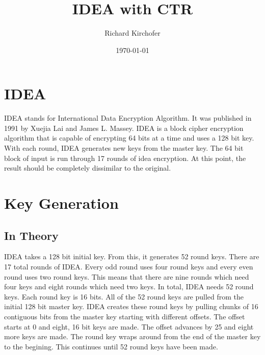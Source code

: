 \documentclass[12pt]{article}
\title{IDEA with CTR}
\author{Richard Kirchofer}
\date{\today}
\begin{document}
\maketitle
\section{IDEA}
IDEA stands for International Data Encryption Algorithm. It was published in 1991 by Xuejia Lai and James L. Massey. IDEA is a block cipher encryption algorithm that is capable of encrypting 64 bits at a time and uses a 128 bit key. With each round, IDEA generates new keys from the master key. The 64 bit block of input is run through 17 rounds of idea encryption. At this point, the result should be completely dissimilar to the original. 

\section{Key Generation}
\subsection{In Theory}
IDEA takes a 128 bit initial key. From this, it generates 52 round keys. There are 17 total rounds of IDEA. Every odd round uses four round keys and every even round uses two round keys. This means that there are nine rounds which need four keys and eight rounds which need two keys. In total, IDEA needs 52 round keys.
Each round key is 16 bits. All of the 52 round keys are pulled from the initial 128 bit master key. IDEA creates these round keys by pulling chunks of 16 contiguous bits from the master key starting with different offsets. The offset starts at 0 and eight, 16 bit keys are made. The offset advances by 25 and eight more keys are made. The round key wraps around from the end of the master key to the begining. This continues until 52 round keys have been made.
\end{document}
